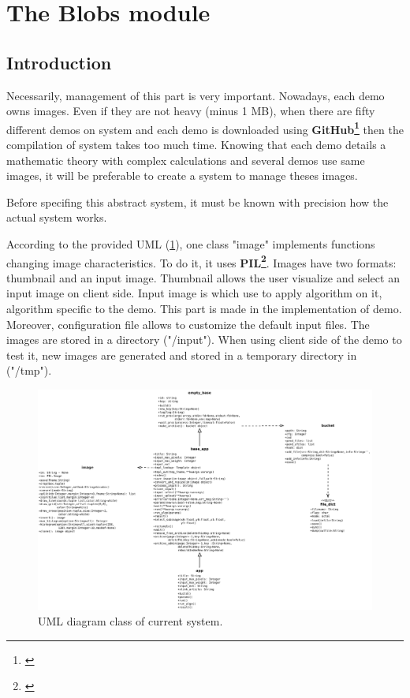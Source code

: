 \section{The Blobs module}


\subsection{Introduction}
\label{sec:blobs_introduction}
Necessarily, management of this part is very important. Nowadays, each demo owns images.
Even if they are not heavy (minus 1 MB),
when there are fifty different demos on system and each demo is downloaded using
\textbf{GitHub\footnote{\cite{GitHub}}} then the compilation of system takes too much time.
Knowing that each
demo details a mathematic theory with complex calculations and several demos use
same images, it will be preferable to create a system to manage theses images. \\
\setlength{\parindent}{0cm}

Before specifing this abstract system, it must be known with precision how the actual system
works.\\
\setlength{\parindent}{0cm}

According to the provided UML (\ref{img:IPOL_diagram_class}), one class "image" implements
functions changing image characteristics. To do it, it uses \textbf{PIL\footnote{\cite{PIL}}}.
Images have two formats: thumbnail and an input image. Thumbnail allows the user visualize
and select an input image on client side. Input image is which use to apply algorithm on it,
algorithm specific to the demo. This part is made in the implementation of demo.
Moreover, configuration file allows to customize the default input files.
The images are stored in a directory ("/input"). When using client side of the demo to test
it, new images are generated and stored in a temporary directory in ("/tmp").\\
\setlength{\parindent}{0cm}

\begin{figure}[H]
  \centering
  \includegraphics[width=20.0cm, angle=90]{blobs/images/IPOL_diagram_class.pdf}
  \caption{UML diagram class of current system.}
  \label{img:IPOL_diagram_class}
\end{figure}

